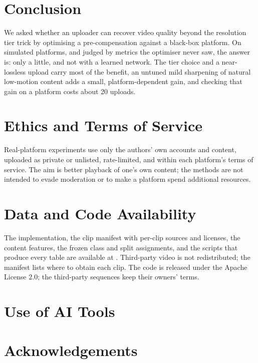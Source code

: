 \section{Conclusion}
\label{sec:conclusion}

We asked whether an uploader can recover video quality beyond the resolution tier trick by
optimising a pre-compensation against a black-box platform. On simulated platforms, and judged by
metrics the optimiser never saw, the answer is: only a little, and not with a learned network. The
tier choice and a near-lossless upload carry most of the benefit, an untuned mild sharpening of natural
low-motion content adds a small, platform-dependent gain, and checking that gain on a platform costs
about 20 uploads. 

\section*{Ethics and Terms of Service}
Real-platform experiments use only the authors' own accounts and content, uploaded as private or
unlisted, rate-limited, and within each platform's terms of service. The aim is better playback of
one's own content; the methods are not intended to evade moderation or to make a platform spend
additional resources. 

\section*{Data and Code Availability}
The implementation, the clip manifest with per-clip sources and licenses, the content features,
the frozen class and split assignments, and the scripts that produce every table are available at
. Third-party video is
not redistributed; the manifest lists where to obtain each clip. The code is released under the
Apache License 2.0; the third-party sequences keep their owners' terms.

\section*{Use of AI Tools}

\section*{Acknowledgements}
